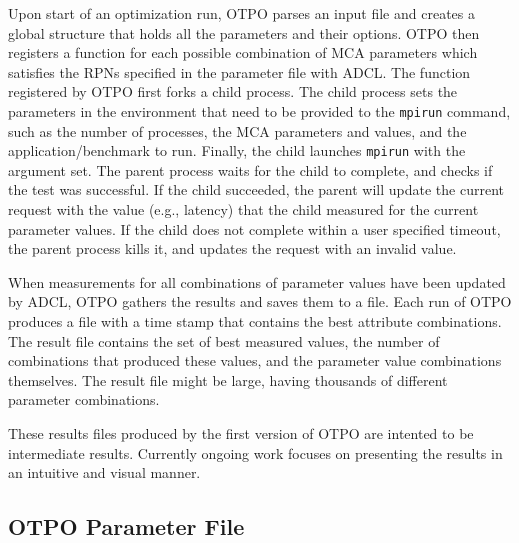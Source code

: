 
Upon start of an optimization run, OTPO parses an input file %
and creates a global structure that holds all the
parameters and their options. OTPO then registers a function for each possible combination of MCA parameters which satisfies the RPNs specified in the parameter file with ADCL. The function registered by OTPO first forks a child process. The child process sets the parameters in the environment that
need to be provided to the {\tt mpirun} command, such as the number of processes, the MCA parameters and values, and the   application/benchmark to run. Finally, the child launches {\tt mpirun} with the argument set. The parent process waits for the child to complete, and checks if the test was successful. %
If the child succeeded, the parent will update the current request with the value (e.g., latency) that the child measured for the current parameter values. If the child does not complete within a user specified timeout, the parent process kills it, and updates the request with an invalid value.

When measurements for all combinations of parameter values have been
updated by ADCL, OTPO gathers the results and saves
them to a file. Each run of OTPO produces a file with a time stamp
that contains the best attribute combinations. The result file
contains the set of best measured values, the number of combinations
that produced these values, and the parameter value combinations
themselves. The result file might be large, having thousands of
different parameter combinations.

These results files produced by the first version of OTPO are intented
to be intermediate results.  Currently ongoing work focuses on presenting the
results in an intuitive and visual manner.


\subsection{OTPO Parameter File}

